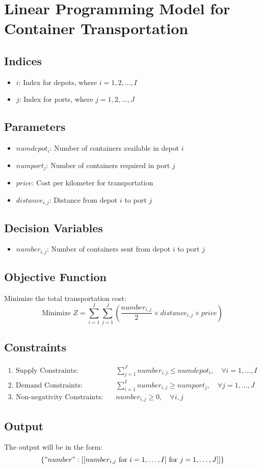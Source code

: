 \documentclass{article}
\begin{document}
\section*{Linear Programming Model for Container Transportation}

\subsection*{Indices}
\begin{itemize}
    \item $i$: Index for depots, where $i = 1, 2, \ldots, I$
    \item $j$: Index for ports, where $j = 1, 2, \ldots, J$
\end{itemize}

\subsection*{Parameters}
\begin{itemize}
    \item $numdepot_i$: Number of containers available in depot $i$
    \item $numport_j$: Number of containers required in port $j$
    \item $price$: Cost per kilometer for transportation
    \item $distance_{i, j}$: Distance from depot $i$ to port $j$
\end{itemize}

\subsection*{Decision Variables}
\begin{itemize}
    \item $number_{i, j}$: Number of containers sent from depot $i$ to port $j$
\end{itemize}

\subsection*{Objective Function}
Minimize the total transportation cost:
\[
\text{Minimize } Z = \sum_{i=1}^{I} \sum_{j=1}^{J} \left( \frac{number_{i, j}}{2} \times distance_{i, j} \times price \right)
\]

\subsection*{Constraints}
\begin{align*}
\text{1. Supply Constraints:} & \quad \sum_{j=1}^{J} number_{i, j} \leq numdepot_i, \quad \forall i = 1, \ldots, I \\
\text{2. Demand Constraints:} & \quad \sum_{i=1}^{I} number_{i, j} \geq numport_j, \quad \forall j = 1, \ldots, J \\
\text{3. Non-negativity Constraints:} & \quad number_{i, j} \geq 0, \quad \forall i, j
\end{align*}

\subsection*{Output}
The output will be in the form:
\[
\{ "number": [[number_{i,j} \text{ for } i = 1, \ldots, I] \text{ for } j = 1, \ldots, J] ] \}
\]
\end{document}
